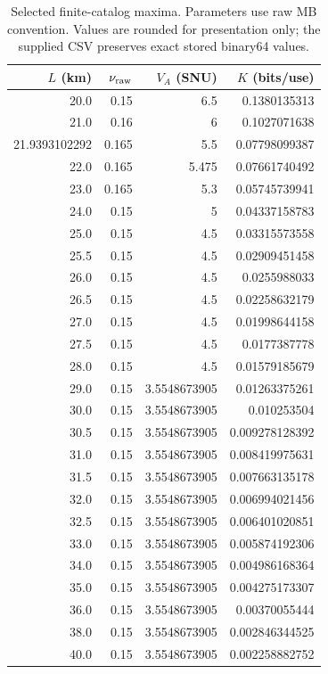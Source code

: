 \begin{table}[htbp]
\centering\small
\caption{Selected finite-catalog maxima. Parameters use raw MB convention. Values are rounded for presentation only; the supplied CSV preserves exact stored binary64 values.}
\label{tab:ao-parameters-26}
\begin{tabular}{rrrr}
\hline
$L$ (km) & $\nu_{\rm raw}$ & $V_A$ (SNU) & $K$ (bits/use) \\
\hline
20.0 &0.15 &6.5 &0.1380135313 \\
21.0 &0.16 &6 &0.1027071638 \\
21.9393102292 &0.165 &5.5 &0.07798099387 \\
22.0 &0.165 &5.475 &0.07661740492 \\
23.0 &0.165 &5.3 &0.05745739941 \\
24.0 &0.15 &5 &0.04337158783 \\
25.0 &0.15 &4.5 &0.03315573558 \\
25.5 &0.15 &4.5 &0.02909451458 \\
26.0 &0.15 &4.5 &0.0255988033 \\
26.5 &0.15 &4.5 &0.02258632179 \\
27.0 &0.15 &4.5 &0.01998644158 \\
27.5 &0.15 &4.5 &0.0177387778 \\
28.0 &0.15 &4.5 &0.01579185679 \\
29.0 &0.15 &3.5548673905 &0.01263375261 \\
30.0 &0.15 &3.5548673905 &0.010253504 \\
30.5 &0.15 &3.5548673905 &0.009278128392 \\
31.0 &0.15 &3.5548673905 &0.008419975631 \\
31.5 &0.15 &3.5548673905 &0.007663135178 \\
32.0 &0.15 &3.5548673905 &0.006994021456 \\
32.5 &0.15 &3.5548673905 &0.006401020851 \\
33.0 &0.15 &3.5548673905 &0.005874192306 \\
34.0 &0.15 &3.5548673905 &0.004986168364 \\
35.0 &0.15 &3.5548673905 &0.004275173307 \\
36.0 &0.15 &3.5548673905 &0.00370055444 \\
38.0 &0.15 &3.5548673905 &0.002846344525 \\
40.0 &0.15 &3.5548673905 &0.002258882752 \\
\hline
\end{tabular}
\end{table}
